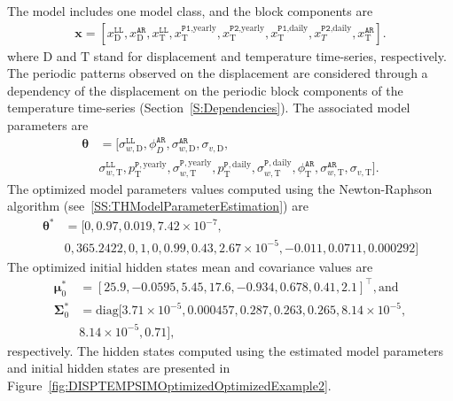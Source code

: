 The model includes one model class, and the block components are 
\begin{gather*}
\textbf{x}=[x^{\mathtt{LL}}_{\text{D}}, x^{\mathtt{AR}}_{\text{D}}, x^{\mathtt{LL}}_{\text{T}}, x^{\mathtt{P1}\text{,yearly}}_{\text{T}}, x^{\mathtt{P2}\text{,yearly}}_{\text{T}}, x^{\mathtt{P1}\text{,daily}}_{\text{T}} , x^{\mathtt{P2}\text{,daily}}_{T}, x^{\mathtt{AR}}_{\text{T}}].
\end{gather*}
where $\text{D}$ and $\text{T}$ stand for displacement and temperature time-series, respectively.
The periodic patterns observed on the displacement are considered through a dependency of the displacement on the periodic block components of the temperature time-series (Section~\ref{S:Dependencies}).
The associated model parameters are
\begin{align*}
\bm\theta & =[\sigma_{w, \text{D}}^{\mathtt{LL}}, \phi^{\mathtt{AR}}_{D}, \sigma_{w, \text{D}}^{\mathtt{AR}}, \sigma_{v, \text{D}},  \\
&  \sigma_{w, \text{T}}^{\mathtt{LL}},  p^{\mathtt{P}, \text{yearly}}_{\text{T}}, \sigma_{w, \text{T}}^{\mathtt{P}, \text{yearly}} , p^{\mathtt{P}, \text{daily}}_{\text{T}} , \sigma_{w, \text{T}}^{\mathtt{P}, \text{daily}}, \phi^{\mathtt{AR}}_{\text{T}}, \sigma_{w, \text{T}}^{\mathtt{AR}}, \sigma_{v, \text{T}}].
\end{align*}
The optimized model parameters values computed using the Newton-Raphson algorithm (see~\ref{SS:THModelParameterEstimation}) are
\begin{align*}
 \bm\theta^{\text{*}}& =[0, 0.97, 0.019, 7.42\times10^{-7},  \\
 & 0, 365.2422, 0, 1, 0, 0.99, 0.43, 2.67\times10^{-5}, -0.011, 0.0711, 0.000292 ]
\end{align*}
The optimized initial hidden states mean and covariance values are 
\begin{align*}
\bm \mu^{*}_{0} & = [	 25.9  ,	-0.0595	, 5.45  	, 17.6  ,	-0.934	, 0.678 ,	0.41  ,	2.1]^{\intercal}, \text{and} \\
\bm\Sigma^{*}_{0} & = \text{diag} [	3.71\times10^{-5},	0.000457	, 0.287 	, 0.263 ,	0.265 	,8.14\times10^{-5}	, \\
 & 8.14\times10^{-5}	, 0.71    ], 
 \end{align*}
 respectively.
The hidden states computed using the estimated model parameters and initial hidden states are presented in Figure~\ref{fig:DISPTEMPSIMOptimizedOptimizedExample2}.


